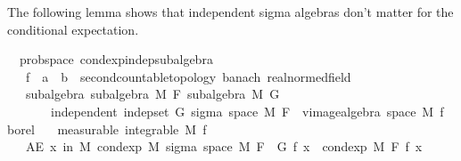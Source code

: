 \begin{isabellebody}
\isamarkupfalse%
%
\endisatagproof
{\isafoldproof}%
%
\isadelimproof
%
\endisadelimproof
%
\begin{isamarkuptext}%
The following lemma shows that independent sigma algebras don't matter for the conditional expectation.%
\end{isamarkuptext}\isamarkuptrue%
\isamarkupfalse%
\ {\isacharparenleft}{\kern0pt}\ prob{\isacharunderscore}{\kern0pt}space{\isacharparenright}{\kern0pt}\ cond{\isacharunderscore}{\kern0pt}exp{\isacharunderscore}{\kern0pt}indep{\isacharunderscore}{\kern0pt}subalgebra{\isacharcolon}{\kern0pt}\isanewline
\ \ \ f\ {\isacharcolon}{\kern0pt}{\isacharcolon}{\kern0pt}\ {\isachardoublequoteopen}{\isacharprime}{\kern0pt}a\ {\isasymRightarrow}\ {\isacharprime}{\kern0pt}b\ {\isacharcolon}{\kern0pt}{\isacharcolon}{\kern0pt}\ {\isacharbraceleft}{\kern0pt}second{\isacharunderscore}{\kern0pt}countable{\isacharunderscore}{\kern0pt}topology{\isacharcomma}{\kern0pt}\ banach{\isacharcomma}{\kern0pt}\ real{\isacharunderscore}{\kern0pt}normed{\isacharunderscore}{\kern0pt}field{\isacharbraceright}{\kern0pt}{\isachardoublequoteclose}\isanewline
\ \ \ subalgebra{\isacharcolon}{\kern0pt}\ {\isachardoublequoteopen}subalgebra\ M\ F{\isachardoublequoteclose}\ {\isachardoublequoteopen}subalgebra\ M\ G{\isachardoublequoteclose}\isanewline
\ \ \ \ \ \ \ independent{\isacharcolon}{\kern0pt}\ {\isachardoublequoteopen}indep{\isacharunderscore}{\kern0pt}set\ G\ {\isacharparenleft}{\kern0pt}sigma\ {\isacharparenleft}{\kern0pt}space\ M{\isacharparenright}{\kern0pt}\ {\isacharparenleft}{\kern0pt}F\ {\isasymunion}\ vimage{\isacharunderscore}{\kern0pt}algebra\ {\isacharparenleft}{\kern0pt}space\ M{\isacharparenright}{\kern0pt}\ f\ borel{\isacharparenright}{\kern0pt}{\isacharparenright}{\kern0pt}{\isachardoublequoteclose}\isanewline
\ \ \ {\isacharbrackleft}{\kern0pt}measurable{\isacharbrackright}{\kern0pt}{\isacharcolon}{\kern0pt}\ {\isachardoublequoteopen}integrable\ M\ f{\isachardoublequoteclose}\isanewline
\ \ \ {\isachardoublequoteopen}AE\ x\ in\ M{\isachardot}{\kern0pt}\ cond{\isacharunderscore}{\kern0pt}exp\ M\ {\isacharparenleft}{\kern0pt}sigma\ {\isacharparenleft}{\kern0pt}space\ M{\isacharparenright}{\kern0pt}\ {\isacharparenleft}{\kern0pt}F\ {\isasymunion}\ G{\isacharparenright}{\kern0pt}{\isacharparenright}{\kern0pt}\ f\ x\ {\isacharequal}{\kern0pt}\ cond{\isacharunderscore}{\kern0pt}exp\ M\ F\ f\ x{\isachardoublequoteclose}\isanewline
%
\isadelimproof

\end{isabellebody}
